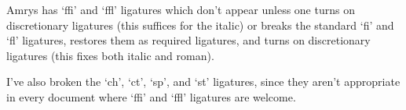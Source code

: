 \documentclass{article}
\begin{document}
Amrys has ‘ffi’ and ‘ffl’ ligatures which don’t appear unless one
turns on discretionary ligatures (this suffices for the italic) or
breaks the standard ‘fi’ and ‘fl’ ligatures, restores them as required
ligatures, and turns on discretionary ligatures (this fixes both
italic and roman).

I’ve also broken the ‘ch’, ‘ct’, ‘sp’, and ‘st’ ligatures, since they
aren’t appropriate in every document where ‘ffi’ and ‘ffl’ ligatures
are welcome.
\end{document}
